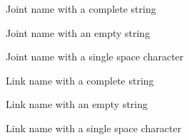 
\begin{DoxyRefList}
\item[Member \mbox{\hyperlink{joint__unit__tests_8cpp_a05a5e3e37ffc9dc04f711be9a26b0daa}{T\+E\+ST}} (Joint\+Unit\+Tests, get\+Name)]\label{test__test000001}%
%
Joint name with a complete string 

\label{test__test000002}%
%
Joint name with an empty string 

\label{test__test000003}%
%
Joint name with a single space character  
\item[Member \mbox{\hyperlink{link__unit__tests_8cpp_a0b7cea14ffec3eae9289e81e69c0d5e0}{T\+E\+ST}} (Link\+Unit\+Tests, get\+Name)]\label{test__test000004}%
%
Link name with a complete string 

\label{test__test000005}%
%
Link name with an empty string 

\label{test__test000006}%
%
Link name with a single space character 
\end{DoxyRefList}